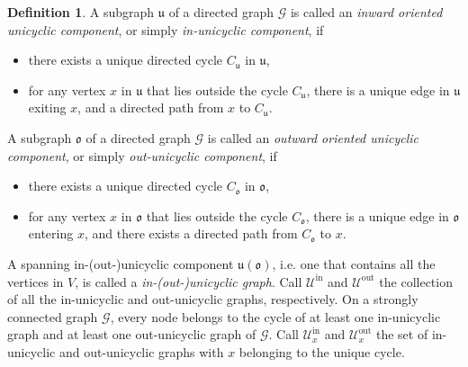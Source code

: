 \documentclass[reqno]{amsart}
\theoremstyle{plain}
\theoremstyle{definition}
\newtheorem{definition}[theorem]{Definition}
\theoremstyle{remark}
\numberwithin{equation}{section}
\numberwithin{theorem}{section}
\newcommand{\<}{\langle}
\renewcommand{\>}{\rangle}
\begin{document}
\begin{definition}\label{def:inout}
	A subgraph $\mathfrak u$ of a directed graph $\mathcal G$ is called an \emph{inward oriented unicyclic component}, or simply \emph{in-unicyclic component}, if 
	
	\begin{itemize}
		\item there exists a unique directed cycle $C_{\mathfrak u}$ in $\mathfrak u$,
		\item for any vertex $x$ in $\mathfrak u$ that lies outside the cycle $C_{\mathfrak u}$, there is a unique edge in $\mathfrak u$ exiting $x$, and a directed path from $x$ to $C_{\mathfrak u}$.
	\end{itemize}
	A subgraph $\mathfrak o$ of a directed graph $\mathcal G$ is called an \emph{outward oriented unicyclic component}, or simply \emph{out-unicyclic component}, if 
	
	\begin{itemize}
		\item there exists a unique directed cycle $C_{\mathfrak o }$ in $\mathfrak o$,
		\item for any vertex $x$ in $\mathfrak o$ that lies outside the cycle $C_{\mathfrak o}$, there is a unique edge in $\mathfrak o$ entering $x$, and there exists a directed path from $C_{\mathfrak o}$ to $x$. 
	\end{itemize}
	
	A spanning in-(out-)unicyclic component $\mathfrak u(\mathfrak{o})$, i.e. one that contains all the vertices in $V$,  is  called a \emph{in-(out-)unicyclic graph}. Call $\mathcal U^{\mathrm{in}}$ and  $\mathcal U^{\mathrm{out}}$ the collection of all the in-unicyclic and out-unicyclic graphs, respectively. 
	On a strongly connected graph $\mathcal{G}$, every node belongs to the cycle of at least one in-unicyclic graph and at least one out-unicyclic graph  of $\mathcal{G}$. Call $\mathcal U_x^{\mathrm{in}}$ and $\mathcal U_x^{\mathrm{out}}$ the set of in-unicyclic and out-unicyclic graphs with $x$ belonging to the unique cycle.
\end{definition}


\end{document}
